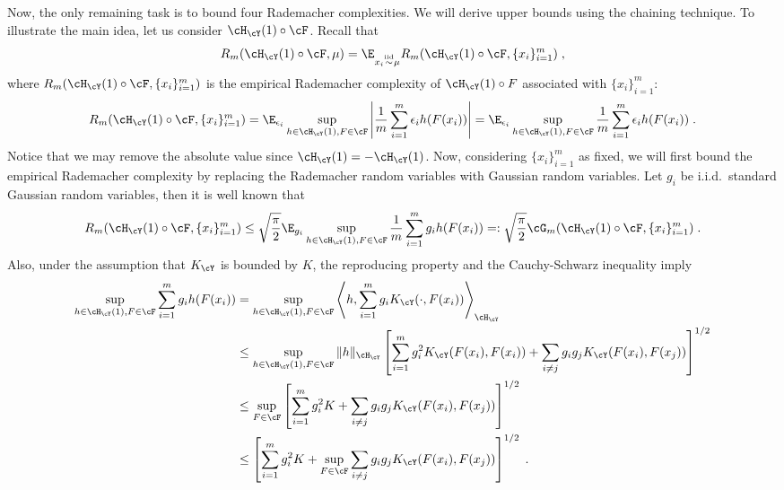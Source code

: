 \documentclass[11pt]{article}
\begin{document}
Now, the only remaining task is to bound four Rademacher complexities. We will derive upper bounds using the chaining technique. To illustrate the main idea, let us consider $\cH_{\cY}(1) \circ \cF$. Recall that
\begin{equation*}
	R_m(\cH_{\cY}(1) \circ \cF, \mu) = \E_{x_i \overset{\mathrm{iid}}{\sim} \mu} R_m(\cH_{\cY}(1) \circ \cF, \{x_i\}_{i=1}^{m})\;,
\end{equation*}
where $R_m(\cH_{\cY}(1) \circ \cF, \{x_i\}_{i=1}^{m})$ is the empirical Rademacher complexity of $\cH_{\cY}(1) \circ F$ associated with $\{x_i\}_{i=1}^{m}$:
\begin{equation*}
	R_m(\cH_{\cY}(1) \circ \cF, \{x_i\}_{i=1}^{m}) = \E_{\epsilon_i} \sup_{h \in \cH_{\cY}(1), F \in \cF} \left|\frac{1}{m} \sum_{i=1}^{m} \epsilon_i h(F(x_i))\right| = \E_{\epsilon_i} \sup_{h \in \cH_{\cY}(1), F \in \cF} \frac{1}{m} \sum_{i=1}^{m} \epsilon_i h(F(x_i))\;.
\end{equation*}
Notice that we may remove the absolute value since $\cH_{\cY}(1) = - \cH_{\cY}(1)$. Now, considering $\{x_i\}_{i=1}^{m}$ as fixed, we will first bound the empirical Rademacher complexity by replacing the Rademacher random variables with Gaussian random variables. Let $g_i$ be i.i.d.\ standard Gaussian random variables, then it is well known that
\begin{equation*}
	R_m(\cH_{\cY}(1)\circ \cF, \{x_i\}_{i=1}^m)
	\le \sqrt{\frac{\pi}{2}} \E_{g_i} \sup_{h \in \cH_{\cY}(1), F \in \cF} \frac{1}{m} \sum_{i=1}^m  g_i h(F(x_i)) =: \sqrt{\frac{\pi}{2}} \cG_m(\cH_{\cY}(1)\circ \cF, \{x_i\}_{i=1}^m)\;.
\end{equation*}
Also, under the assumption that $K_{\cY}$ is bounded by $K$, the reproducing property and the Cauchy-Schwarz inequality imply
\begin{equation*}
	\begin{split}
		\sup_{h \in \cH_{\cY}(1), F \in \cF} \sum_{i=1}^{m} g_i h(F(x_i))
		& = \sup_{h \in \cH_{\cY}(1), F \in \cF} \left\langle h, \sum_{i=1}^{m} g_i K_{\cY}(\cdot, F(x_i)) \right\rangle_{\cH_{\cY}} \\
		& \le \sup_{h \in \cH_{\cY}(1), F \in \cF} \|h\|_{\cH_{\cY}} \left[\sum_{i = 1}^{m} g_i^2 K_{\cY}( F(x_i), F(x_i)) + \sum_{i\neq j} g_i g_j K_{\cY}(F(x_i), F(x_j)) \right]^{1/2} \\
		& \le \sup_{F \in \cF} \left[\sum_{i = 1}^{m} g_i^2 K + \sum_{i\neq j} g_i g_j K_{\cY}(F(x_i), F(x_j)) \right]^{1/2} \\
		& \le \left[\sum_{i = 1}^{m} g_i^2 K + \sup_{F \in \cF} \sum_{i\neq j} g_i g_j K_{\cY}(F(x_i), F(x_j)) \right]^{1/2} \;.
	\end{split}
\end{equation*}
\end{document}
